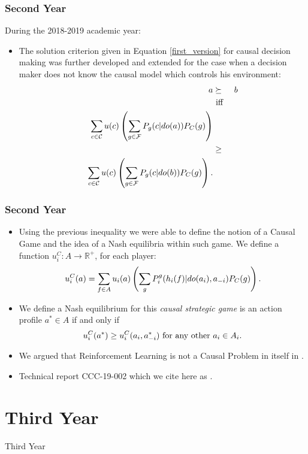 \documentclass{beamer}
\theoremstyle{plain}
\begin{document}
\begin{frame}
\frametitle{Second Year}
During the 2018-2019 academic year:
\begin{itemize}
\item The solution criterion given in Equation \ref{first_version} for causal decision making was further developed and extended for the case when a decision maker does not know the causal model which controls his environment:
\begin{eqnarray*}{\label{second_version}}
a &\succeq & b\\ 
   &\textrm{ iff }&\\ 
\sum_{c \in \mathcal{C}} u(c) \left( \sum_{g \in \mathcal{F}} P_g(c | do(a))P_C(g) \right) \\
&\geq & \\ \sum_{c \in \mathcal{C}}  u(c) \left( \sum_{g \in \mathcal{F}} P_g(c | do(b))P_C(g) \right).
\end{eqnarray*}
\end{itemize}
\end{frame}

\begin{frame}
\frametitle{Second Year}
\begin{itemize}
\item Using the previous inequality we were able to define the notion of a Causal Game and the idea of a Nash equilibria within such game. We define a function $u^C_i : A \to \mathbb{R}^{+}$, for each player:
\begin{equation}{\label{games_causal_ut}}
u^C_i (a) = \sum_{f \in A}  u_i(a) \left( \sum_g P^g_i (h_i(f) | do(a_i), a_{-i}) P_C(g) \right).
\end{equation}
\item We define a Nash equilibrium for this \textit{causal strategic game} is an action profile $a^\ast \in A$ if and only if
\begin{equation}{\label{nash_eq}}
 u^C_i(a^\ast) \geq u^C_i(a_i, a^\ast_{-i}) \textrm{ for any other } a_i \in A_i. 
 \end{equation}
 \item We argued that Reinforcement Learning is not a Causal Problem in itself in \cite{gonzalez2019reinforcement}.
 \item Technical report CCC-19-002 which we cite here as \cite{gonzalez2019causal}. 
\end{itemize}
\end{frame}

\section{Third Year}
\begin{frame}
\begin{center}
\LARGE{Third Year}
\end{center}
\end{frame}
\end{document}
